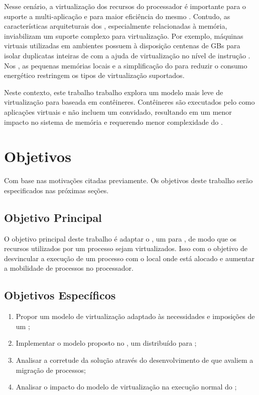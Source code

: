 Nesse cenário, a virtualização dos recursos do processador é importante para o suporte a multi-aplicação e para maior eficiência do mesmo \cite{vanz2022virtualizaccao}. Contudo, as características arquiteturais dos \lws, especialmente relacionadas à memória, inviabilizam um suporte complexo para virtualização. Por exemplo, máquinas virtuais utilizadas em ambientes \cloud possuem à disposição centenas de GBs para isolar duplicatas inteiras de \oss com a ajuda de virtualização no nível de instrução \cite{sharma2016containers}. Nos \lws, as pequenas memórias locais e a simplificação do \hardware para reduzir o consumo energético restringem os tipos de virtualização suportados.

Neste contexto, este trabalho trabalho explora um modelo mais leve de virtualização para \lw baseada em contêineres. Contêineres são executados pelo \os como aplicações virtuais e não incluem um \os convidado, resultando em um menor impacto no sistema de memória e requerendo menor complexidade do \hardware \cite{thalheim2018cntr, sharma2016containers}.

\glsresetall
\section{Objetivos}
\label{sec.goals}

Com base nas motivações citadas previamente. Os objetivos deste trabalho serão especificados nas próximas seções.

\subsection{Objetivo Principal}
\label{sec.goals.primary}

O objetivo principal deste trabalho é adaptar o \nanvix, um \so para \lws, de modo que os recursos utilizados por um processo sejam virtualizados. Isso com o objetivo de desvincular a execução de um processo com o local \ie \cluster onde está alocado e aumentar a mobilidade de processos no processador.

\subsection{Objetivos Específicos}
\label{sec.goals.secondary}

\begin{enumerate}[label= (\roman*)]
    \item Propor um modelo de virtualização adaptado às necessidades e imposições de um \lw;
    \item Implementar o modelo proposto no \nanvix, um \so distribuído para \lws;
    \item Analisar a corretude da solução através do desenvolvimento de \benchmarks que avaliem a migração de processos;
    \item Analisar o impacto do modelo de virtualização na execução normal do \nanvix;
\end{enumerate}

